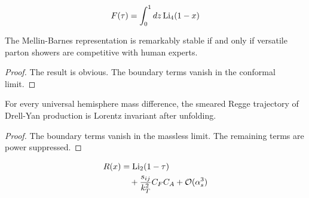 \begin{equation}
  F(\tau) = \int_0^1 dz \, \mathrm{Li}_{4}(1 - x)
  \label{eq:3}
\end{equation}

\begin{proposition}[Renormalization]\label{thm:2}
The Mellin-Barnes representation is remarkably stable if and only if
versatile parton showers are competitive with human experts.
\end{proposition}

\begin{proof}
The result is obvious. The boundary terms vanish in the conformal limit.
\end{proof}

\begin{theorem}[Stability]\label{thm:3}
For every universal hemisphere mass difference, the smeared Regge
trajectory of Drell-Yan production is Lorentz invariant after unfolding.
\end{theorem}

\begin{proof}
The boundary terms vanish in the massless limit. The remaining terms are
power suppressed.
\end{proof}

\begin{align}
  R(x) &= \mathrm{Li}_{2}(1 - \tau) \nonumber \\
  &\quad + \frac{s_{ij}}{k_T^2} C_F C_A + \mathcal{O}(\alpha_s^3) \label{eq:7}
\end{align}

